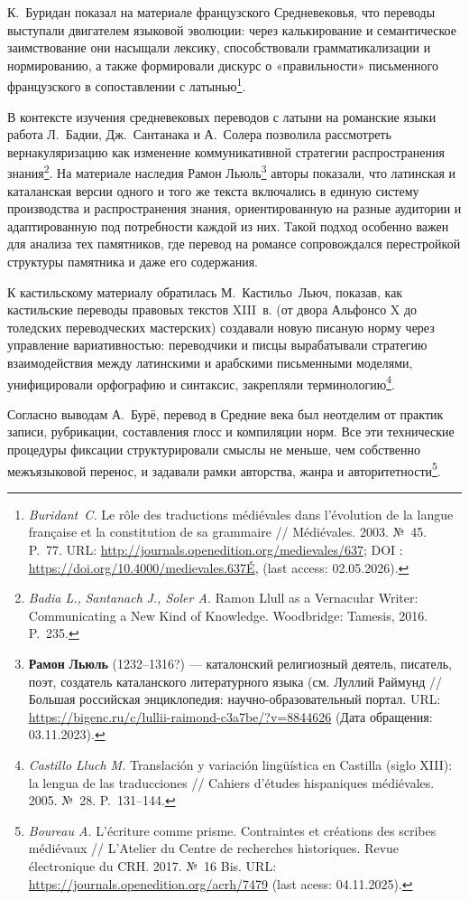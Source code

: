 К.~Буридан показал на материале французского Средневековья, что переводы выступали двигателем языковой эволюции: через калькирование и семантическое заимствование они насыщали лексику, способствовали грамматикализации и нормированию, а также формировали дискурс о «правильности» письменного французского в сопоставлении с латынью\footnote{\emph{Buridant~C.} Le rôle des traductions médiévales dans l'évolution de la langue française et la constitution de sa grammaire // Médiévales. 2003. №~45. P.~77. URL: \url{http://journals.openedition.org/medievales/637}; DOI : \url{https://doi.org/10.4000/medievales.637É}, (last access: 02.05.2026).}.

В контексте изучения средневековых переводов с латыни на романские языки работа Л.~Бадии, Дж.~Сантанака и А.~Солера позволила рассмотреть вернакуляризацию как изменение коммуникативной стратегии распространения знания\footnote{\emph{Badia L., }\emph{Santanach}\emph{ J., Soler A. }Ramon Llull as a Vernacular Writer: Communicating a New Kind of Knowledge. Woodbridge: Tamesis, 2016. P.~235.}. На материале наследия Рамон Льюль\footnote{\textbf{Ра}\textbf{мон}\textbf{ }\textbf{Л}\textbf{ьюль} (1232--1316?) --- каталонский религиозный деятель, писатель, поэт, создатель каталанского литературного языка (см. Луллий Раймунд // Большая российская энциклопедия: научно-образовательный портал.  URL: \url{https://bigenc.ru/c/lullii-raimond-c3a7be/?v=8844626} (Дата обращения: 03.11.2023).} авторы показали, что латинская и каталанская версии одного и того же текста включались в единую систему производства и распространения знания, ориентированную на разные аудитории и адаптированную под потребности каждой из них. Такой подход особенно важен для анализа тех памятников, где перевод на романсе сопровождался перестройкой структуры памятника и даже его содержания.

К кастильскому материалу обратилась М.~Кастильо~Льюч, показав, как кастильские переводы правовых текстов XIII~в. (от двора Альфонсо X до толедских переводческих мастерских) создавали новую писаную норму через управление вариативностью: переводчики и писцы вырабатывали стратегию взаимодействия между латинскими и арабскими письменными моделями, унифицировали орфографию и синтаксис, закрепляли терминологию\footnote{\emph{Castillo Lluch M. }Translación y variación lingüística en Castilla (siglo XIII): la lengua de las traducciones // Cahiers d'études hispaniques médiévales. 2005. №~28. P.~131--144.}.

Согласно выводам А.~Бурё, перевод в Средние века был неотделим от практик записи, рубрикации, составления глосс и компиляции норм. Все эти технические процедуры фиксации структурировали смыслы не меньше, чем собственно межъязыковой перенос, и задавали рамки авторства, жанра и авторитетности\footnote{\emph{Boureau A. }L’écriture comme prisme. Contraintes et créations des scribes médiévaux // L’Atelier du Centre de recherches historiques. Revue électronique du CRH. 2017. №~16 Bis. URL: \url{https://journals.openedition.org/acrh/7479} (last acess: 04.11.2025).}.

